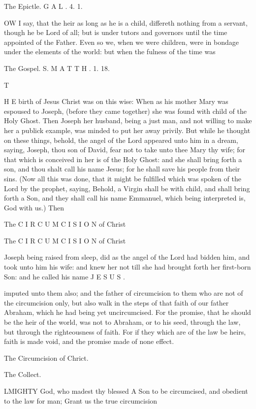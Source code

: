 The Epictle. G A L . 4. 1.

OW I say, that the heir as long as he is a child, differeth nothing from a servant, though he be Lord of all; but is under tutors and governors until the time appointed of the Father. Even so we, when we were children, were in bondage under the elements of the world: but when the fulness of the time was

The Gospel. S. M A T T H . 1. 18.

T

H E birth of Jesus Christ was on this wise: When as his mother Mary was espoused to Joseph, (before they came together) she was found with child of the Holy Ghost. Then Joseph her husband, being a just man, and not willing to make her a publick example, was minded to put her away privily. But while he thought on these things, behold, the angel of the Lord appeared unto him in a dream, saying, Joseph, thou son of David, fear not to take unto thee Mary thy wife; for that which is conceived in her is of the Holy Ghost: and she shall bring forth a son, and thou shalt call his name Jesus; for he shall save his people from their sins. (Now all this was done, that it might be fulfilled which was spoken of the Lord by the prophet, saying, Behold, a Virgin shall be with child, and shall bring forth a Son, and they shall call his name Emmanuel, which being interpreted is, God with us.) Then

The C I R C U M C I S I O N of Christ

The C I R C U M C I S I O N of Christ

Joseph being raised from sleep, did as the angel of the Lord had bidden him, and took unto him his wife: and knew her not till she had brought forth her first-born Son: and he called his name J E S U S .

imputed unto them also; and the father of circumcision to them who are not of the circumcision only, but also walk in the steps of that faith of our father Abraham, which he had being yet uncircumcised. For the promise, that he should be the heir of the world, was not to Abraham, or to his seed, through the law, but through the righteousness of faith. For if they which are of the law be heirs, faith is made void, and the promise made of none effect.

The Circumcision of Chrict.

The Collect.

LMIGHTY God, who madest thy blessed A Son to be circumcised, and obedient to the law for man; Grant us the true circumcision

